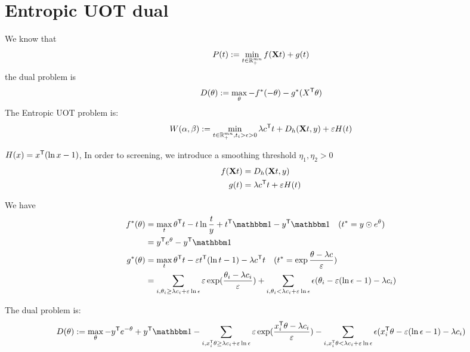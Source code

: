 
\section{Entropic UOT dual}
We know that 
\begin{equation}
P(t):= \min_{t \in \mathbb{R}_{+}^{mn}} f(\mathbf{X} t) + g(t)
\end{equation}
the dual problem is 
\begin{equation}
D(\theta) := \max_{\theta} -f^*(-\theta) - g^*(X^{\mathsf T}\theta)
\end{equation}
The Entropic UOT problem is:
\begin{equation}
\label{eq:euot}
W(\alpha,\beta) := \min_{t \in \mathbb{R}_{+}^{mn}, t_i>\epsilon>0} \lambda c^{\mathsf T}t + D_h(\mathbf{X}t,y) + \varepsilon H(t)
\end{equation} 

$H(x) = x^{\mathsf T}(\ln x - 1)$, In order to screening, we introduce a smoothing threshold $\eta_1,\eta_2 > 0$ 
$$
\begin{aligned}
f(\mathbf{X} t) &=  D_h(\mathbf{X}t,y) \\
g(t) &= \lambda c^{\mathsf T} t + \varepsilon H(t)
\end{aligned}
$$

We have 
$$
\begin{aligned}
f^{*}(\theta) &= \max_t \theta^{\tranT} t -  t\ln \frac{t}{y} + t^{\tranT}\one - y^{\tranT}\one\quad (t^{*}=y \odot e^{\theta})\\
&=y^{\tranT} e^{\theta} - y^{\tranT}\one \\
g^{*}(\theta) &= \max_t \theta^{\tranT} t - \varepsilon t^{\tranT}(\ln t -1) - \lambda c^{\tranT}t \quad(t^* = \exp{\frac{\theta-\lambda c}{\varepsilon}})\\
&= \sum_{i,\theta_i\geq\lambda c_i +\varepsilon\ln \epsilon } \varepsilon \exp(\frac{\theta_i-\lambda c_i}{\varepsilon})+\sum_{i,\theta_i<\lambda c_i +\varepsilon\ln \epsilon} \epsilon(\theta_i - \varepsilon(\ln\epsilon-1)-\lambda c_i) 
\end{aligned}
$$

The dual problem is:
\begin{equation}
\label{eq:reuot}
D(\theta) := \max_{\theta} -y^{\tranT}e^{-\theta} + y^{\tranT}\one - \sum_{i,x_i^{\tranT}\theta\geq\lambda c_i +\varepsilon\ln \epsilon} \varepsilon \exp(\frac{x_i^{\tranT}\theta-\lambda c_i}{\varepsilon}) - \sum_{i,x_i^{\tranT}\theta<\lambda c_i +\varepsilon\ln \epsilon } \epsilon(x_i^{\tranT}\theta - \varepsilon(\ln\epsilon-1)-\lambda c_i)
\end{equation}

